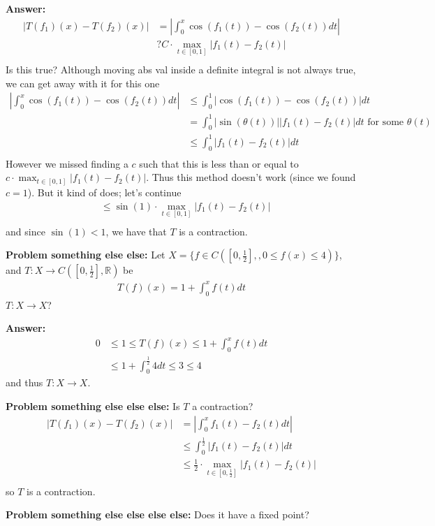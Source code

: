\documentclass{article}
\newcommand*{\txt}[1]{\text{ #1 }}%
\newcommand*{\rr}{\mathbb{R}}%
\begin{document}
\textbf{Answer:} \begin{align*}
    |T(f_1)(x)-T(f_2)(x)|&=|\int_{0}^{x}\cos(f_1(t))-\cos(f_2(t))dt|\\
    &? C\cdot \max_{t\in[0,1]}|f_1(t)-f_2(t)|\\
\end{align*} Is this true? Although moving abs val inside a definite integral is not always true, we can get away with it for this one \begin{align*}
    |\int_{0}^{x}\cos(f_1(t))-\cos(f_2(t))dt|&\leq \int_{0}^{1}|\cos(f_1(t))-\cos(f_2(t))|dt\\
    &=\int_{0}^{1}|\sin(\theta(t))||f_1(t)-f_2(t)|dt\txt{for some}\theta(t)\\
    &\leq \int_{0}^{1}|f_1(t)-f_2(t)|dt\\
\end{align*} However we missed finding a $c$ such that this is less than or equal to $c\cdot \max_{t\in[0,1]}|f_1(t)-f_2(t)|$. Thus this method doesn't work (since we found $c=1$). But it kind of does; let's continue \begin{align*}
    &\leq \sin(1)\cdot \max_{t\in[0,1]}|f_1(t)-f_2(t)|\\
\end{align*} and since $\sin(1)<1$, we have that $T$ is a contraction.

\textbf{Problem something else else:} Let $X=\{f\in C([0,\frac{1}{2}],,0\leq f(x)\leq 4)\}$, and $T:X\to C([0,\frac{1}{2}],\rr)$ be \begin{align*}
    T(f)(x)=1+\int_{0}^{x}f(t)dt
\end{align*} $T:X\to X$?

\textbf{Answer:} \begin{align*}
    0&\leq 1 \leq T(f)(x)\leq 1+\int_{0}^{x}f(t)dt\\
    &\leq 1+\int_{0}^{\frac{1}{2}}4dt\leq 3\leq 4
\end{align*} and thus $T:X\to X$.

\textbf{Problem something else else else:} Is $T$ a contraction? \begin{align*}
    |T(f_1)(x)-T(f_2)(x)|&=|\int_{0}^{x}f_1(t)-f_2(t)dt|\\
    &\leq \int_{0}^{\frac{1}{2}}|f_1(t)-f_2(t)|dt\\
    &\leq \frac{1}{2}\cdot \max_{t\in[0,\frac{1}{2}]}|f_1(t)-f_2(t)|\\
\end{align*} so $T$ is a contraction.

\textbf{Problem something else else else else:} Does it have a fixed point?
\end{document}
